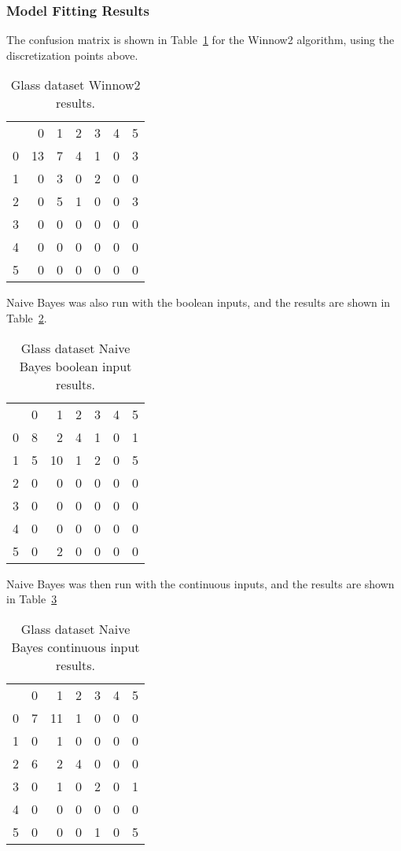 \documentclass{amsart}
\begin{document}
\subsubsection*{Model Fitting Results}
The confusion matrix is shown in Table~\ref{glass_winnow2} for the Winnow2 algorithm, using the
discretization points above.
\begin{table}
\begin{tabular}{lrrrrrr}
{} &   0 &  1 &  2 &  3 & 4 &  5 \\
0 &  13 &  7 &  4 &  1 & 0& 3 \\
1 &   0 &  3 &  0 &  2 &  0& 0 \\
2 &   0 &  5 &  1 &  0 &  0&3 \\
3 &   0 &  0 &  0 &  0 &  0& 0 \\
4 &   0 &  0 &  0 & 0 & 0 & 0 \\
5 &   0 &  0 &  0 &  0 &  0&0 \\
\end{tabular}
\label{glass_winnow2}
\caption{Glass dataset Winnow2 results.}
\end{table}
Naive Bayes was also run with the boolean inputs, and the results are shown in Table~\ref{nb_glass_bool}.
\begin{table}
\begin{tabular}{lrrrrrr}
{} &  0 &   1 &  2 &  3 &  4& 5 \\
0 &  8 &   2 &  4 &  1 &  0&1 \\
1 &  5 &  10 &  1 &  2 &  0&5 \\
2 &  0 &   0 &  0 &  0 &  0&0 \\
3 &  0 &   0 &  0 &  0 &  0&0 \\
4 &  0 &   0 &  0 &  0 &  0 &0 \\
5 &  0 &   2 &  0 &  0 &  0&0 \\
\end{tabular}
\label{nb_glass_bool}
\caption{Glass dataset Naive Bayes boolean input results.}
\end{table}
Naive Bayes was then run with the continuous inputs, and the results are shown in Table~\ref{nb_glass}
\begin{table}
\begin{tabular}{lrrrrrr}
{}&  0 &   1 &  2 &  3 & 4 & 5 \\
0 &  7 &  11 &  1 &  0 &  0 & 0 \\
1 &  0 &   1 &  0 &  0 &  0 & 0 \\
2 &  6 &   2 &  4 &  0 &  0 & 0 \\
3 &  0 &   1 &  0 &  2 &  0 & 1 \\
4 &  0 &   0 &  0 &  0 &  0 & 0 \\
5 &  0 &   0 &  0 &  1 &  0 & 5
\end{tabular}
\label{nb_glass}
\caption{Glass dataset Naive Bayes continuous input results.}
\end{table}
\end{document}
